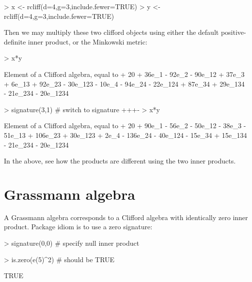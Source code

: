 \documentclass{birkjour}
\theoremstyle{definition}
\theoremstyle{remark}
\numberwithin{equation}{section}
\begin{document}
\begin{Schunk}
\begin{Sinput}
> x <- rcliff(d=4,g=3,include.fewer=TRUE)
> y <- rcliff(d=4,g=3,include.fewer=TRUE)
\end{Sinput}
\end{Schunk}

Then we may multiply these two clifford objects using either the
default positive-definite inner product, or the Minkowski metric:

\begin{Schunk}
\begin{Sinput}
> x*y
\end{Sinput}
\begin{Soutput}
Element of a Clifford algebra, equal to
+ 20 + 36e_1 - 92e_2 - 90e_12 + 37e_3 + 6e_13 + 92e_23 - 30e_123 -
10e_4 - 94e_24 - 22e_124 + 87e_34 + 29e_134 - 21e_234 - 20e_1234
\end{Soutput}
\begin{Sinput}
> signature(3,1)  # switch to signature +++-
> x*y
\end{Sinput}
\begin{Soutput}
Element of a Clifford algebra, equal to
+ 20 + 90e_1 - 56e_2 - 50e_12 - 38e_3 - 51e_13 + 106e_23 + 30e_123 +
2e_4 - 136e_24 - 40e_124 - 15e_34 + 15e_134 - 21e_234 - 20e_1234
\end{Soutput}
\end{Schunk}

In the above, see how the products are different using the two inner
products.  

\section{Grassmann algebra}

A Grassmann algebra corresponds to a Clifford algebra with identically
zero inner product.  Package idiom is to use a zero signature:

\begin{Schunk}
\begin{Sinput}
> signature(0,0)  # specify null inner product
\end{Sinput}
\end{Schunk}
\begin{Schunk}
\begin{Sinput}
> is.zero(e(5)^2)     # should be TRUE
\end{Sinput}
\begin{Soutput}
[1] TRUE
\end{Soutput}
\end{Schunk}
\end{document}
